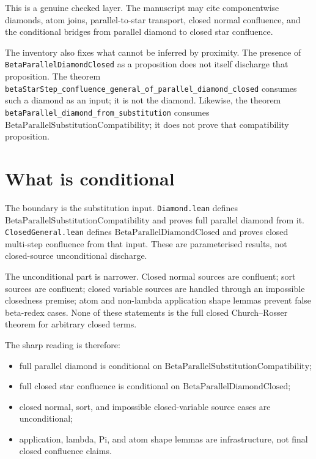 This is a genuine checked layer. The manuscript may cite componentwise
diamonds, atom joins, parallel-to-star transport, closed normal confluence, and
the conditional bridges from parallel diamond to closed star confluence.

The inventory also fixes what cannot be inferred by proximity. The presence of
\texttt{BetaParallelDiamondClosed} as a proposition does not itself discharge
that proposition. The theorem
\texttt{betaStarStep\_confluence\_general\_of\_parallel\_diamond\_closed}
consumes such a diamond as an input; it is not the diamond. Likewise, the
theorem \texttt{betaParallel\_diamond\_from\_substitution} consumes
$\mathrm{BetaParallelSubstitutionCompatibility}$; it does not prove that
compatibility proposition.

\section{What is conditional}
\label{sec:metacic-confluence-audit-map-conditional}

The boundary is the substitution input. \texttt{Diamond.lean} defines
$\mathrm{BetaParallelSubstitutionCompatibility}$ and proves full parallel
diamond from it. \texttt{ClosedGeneral.lean} defines
$\mathrm{BetaParallelDiamondClosed}$ and proves closed multi-step confluence
from that input. These are parameterised results, not closed-source
unconditional discharge.

The unconditional part is narrower. Closed normal sources are confluent; sort
sources are confluent; closed variable sources are handled through an
impossible closedness premise; atom and non-lambda application shape lemmas
prevent false beta-redex cases. None of these statements is the full closed
Church--Rosser theorem for arbitrary closed terms.

The sharp reading is therefore:
\begin{itemize}
\item full parallel diamond is conditional on
  $\mathrm{BetaParallelSubstitutionCompatibility}$;
\item full closed star confluence is conditional on
  $\mathrm{BetaParallelDiamondClosed}$;
\item closed normal, sort, and impossible closed-variable source cases are
  unconditional;
\item application, lambda, Pi, and atom shape lemmas are infrastructure, not
  final closed confluence claims.
\end{itemize}

